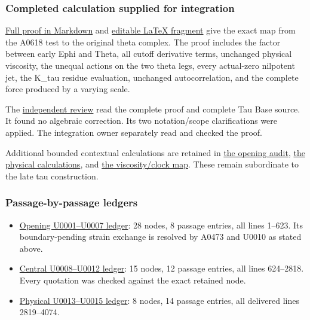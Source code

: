 \subsubsection{Completed calculation supplied for
integration}\label{completed-calculation-supplied-for-integration}

\href{NS_CUTOFF_THETA_SCALING.md}{Full proof in Markdown} and
\href{NS_CUTOFF_THETA_SCALING.tex}{editable LaTeX fragment} give the
exact map from the A0618 test to the original theta complex. The proof
includes the factor \protect{} between early Ephi and Theta, all
cutoff derivative terms, unchanged physical viscosity, the unequal
actions on the two theta legs, every actual-zero nilpotent jet, the
K\_tau residue evaluation, unchanged autocorrelation, and the complete
force produced by a varying scale.

The \href{physical_bridge/PARENT_SCALING_REVIEW.md}{independent review}
read the complete proof and complete Tau Base source. It found no
algebraic correction. Its two notation/scope clarifications were
applied. The integration owner separately read and checked the proof.

Additional bounded contextual calculations are retained in
\href{ns_context/opening_context_audit.md}{the opening audit},
\href{physical_bridge/CALCULATIONS.md}{the physical calculations}, and
\href{physical_bridge/VISCOSITY_MAP.md}{the viscosity/clock map}. These
remain subordinate to the late tau construction.

\subsubsection{Passage-by-passage
ledgers}\label{passage-by-passage-ledgers}

\begin{itemize}
\tightlist
\item
  \href{ns_context/opening_context_audit.md}{Opening U0001--U0007
  ledger}: 28 nodes, 8 passage entries, all lines 1--623. Its
  boundary-pending strain exchange is resolved by A0473 and U0010 as
  stated above.
\item
  \href{AUDIT_LOCAL.md}{Central U0008--U0012 ledger}: 15 nodes, 12
  passage entries, all lines 624--2818. Every quotation was checked
  against the exact retained node.
\item
  \href{physical_bridge/AUDIT.md}{Physical U0013--U0015 ledger}: 8
  nodes, 14 passage entries, all delivered lines 2819--4074.
\end{itemize}

